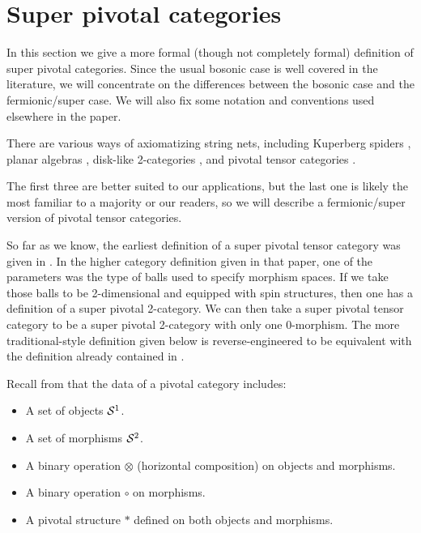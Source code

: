



\section{Super pivotal categories}  \label{def_sect}


In this section we give a more formal (though not completely formal) definition of super pivotal categories.
Since the usual bosonic case is well covered in the literature, we will concentrate on
the differences between the bosonic case and the fermionic/super case.
We will also fix some notation and conventions used elsewhere in the paper.


There are various ways of axiomatizing string nets, including Kuperberg spiders \cite{kup_spider}, 
planar algebras \cite{jones_pa},
disk-like 2-categories \cite{blob_paper}, and pivotal tensor categories \cite{Barrett1999}.

The first three are better suited to our applications, but the last one is likely the most familiar to a majority or our readers,
so we will describe a fermionic/super version of pivotal tensor categories.

So far as we know, the earliest definition of a super pivotal tensor category was given in \cite{blob_paper}.
In the higher category definition given in that paper, one of the parameters was the type of balls used to 
specify morphism spaces.
If we take those balls to be 2-dimensional and equipped with spin structures, then one has a definition of a super pivotal 2-category.
We can then take a super pivotal tensor category to be a super pivotal 2-category with only one 0-morphism.
The more traditional-style definition given below is reverse-engineered to be
equivalent with the definition already contained in \cite{blob_paper}.

\medskip

Recall from 
\cite{Barrett1999}
that the data of a pivotal category includes:
\begin{itemize}
\item A set of objects $\mathcal{S}^1$.
\item A set of morphisms $\mathcal{S}^2$.
\item A binary operation $\otimes$ (horizontal composition) on objects and morphisms.
\item A binary operation $\circ$ on morphisms.
\item A pivotal structure $*$ defined on both objects and morphisms.
\end{itemize}


